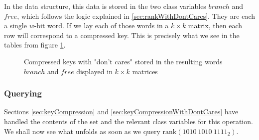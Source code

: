 In the data structure, this data is stored in the two class variables $branch$ and $free$, which follows the logic explained in \ref{sec:rankWithDontCares}. They are each a single $w$-bit word. If we lay each of those words in a $k \times k$ matrix, then each row will correspond to a compressed key. This is precisely what we see in the tables from figure \ref{fig:branchAndFreeCompressedKeys}.%

\begin{figure}[H]
\centering

\caption{Compressed keys with "don't cares" stored in the resulting words $branch$ and $free$ displayed in $k \times k$ matrices}
\label{fig:branchAndFreeCompressedKeys}
\end{figure}

% 

\subsubsection{Querying} \label{sec:rankDontCaresQuery}

Sections \ref{sec:keyCompression} and \ref{sec:keyCompressionWithDontCares} have handled the contents of the set and the relevant class variables for this operation. We shall now see what unfolds as soon as we query $\text{rank}(1010\ 1010\ 1111_2)$.

